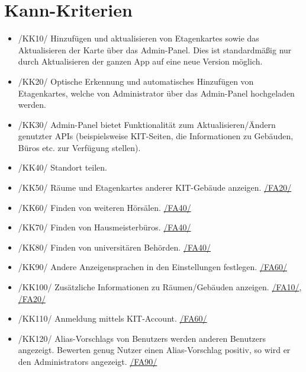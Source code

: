 \section{Kann-Kriterien}

\begin{itemize}

    \item{/KK10/} \label{/KK10/} Hinzufügen und aktualisieren von \Glspl{Etagenkarte} sowie das Aktualisieren der \Gls{Karte} über das \Gls{Admin-Panel}.
        Dies ist standardmäßig nur durch Aktualisieren der ganzen App auf eine neue Version möglich.
    \item{/KK20/} \label{/KK20/} Optische Erkennung und automatisches Hinzufügen von \Glspl{Etagenkarte},
          welche von \Gls{Administrator} über das \Gls{Admin-Panel} hochgeladen werden.
          
    \item{/KK30/} \label{/KK30/} \Gls{Admin-Panel} bietet Funktionalität zum Aktualisieren/Ändern genutzter \Gls{API}s (beispielsweise \Gls{KIT}-Seiten, die Informationen zu Gebäuden, Büros etc. zur Verfügung stellen).
    \item{/KK40/} \label{/KK40/} Standort teilen.
    \item{/KK50/} \label{/KK50/} Räume und \Glspl{Etagenkarte} anderer \Gls{KIT}-Gebäude anzeigen. \hyperref[/FA20/]{/FA20/}
    \item{/KK60/} \label{/KK60/} Finden von weiteren Hörsälen. \hyperref[/FA40/]{/FA40/}
    \item{/KK70/} \label{/KK70/} Finden von Hausmeisterbüros. \hyperref[/FA40/]{/FA40/}
    \item{/KK80/} \label{/KK80/} Finden von universitären Behörden. \hyperref[/FA40/]{/FA40/}
    \item{/KK90/} \label{/KK90/} Andere Anzeigensprachen in den Einstellungen festlegen. \hyperref[/FA60/]{/FA60/}
    \item{/KK100/} \label{/KK100/} Zusätzliche Informationen zu Räumen/Gebäuden anzeigen. \hyperref[/FA10/]{/FA10/}, \hyperref[/FA20/]{/FA20/}
    \item{/KK110/} \label{/KK110/} Anmeldung mittels \Gls{KIT}-Account. \hyperref[/FA60/]{/FA60/}
    \item{/KK120/} \label{/KK120/} \Glspl{Alias-Vorschlag} von \Glspl{Benutzer} werden anderen \Glspl{Benutzer} angezeigt. Bewerten genug Nutzer einen 
    \Gls{Alias-Vorschlag} positiv, so wird er den \Glspl{Administrator} angezeigt. \hyperref[/FA90/]{/FA90/}
    
        

\end{itemize}
